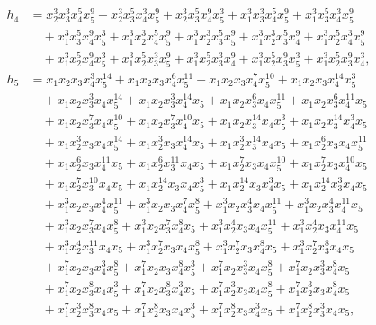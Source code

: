 \documentclass[reqno]{amsart}
\theoremstyle{plain}
\theoremstyle{definition}
\theoremstyle{plain}
\theoremstyle{definition}
\numberwithin{equation}{section}
\begin{document}
\begin{align*}
h_4 &= x_2^{3}x_3^{3}x_4^{5}x_5^{9} + x_2^{3}x_3^{5}x_4^{3}x_5^{9} + x_2^{3}x_3^{5}x_4^{9}x_5^{3} + x_1^{3}x_3^{3}x_4^{5}x_5^{9} + x_1^{3}x_3^{5}x_4^{3}x_5^{9}\\ &\quad + x_1^{3}x_3^{5}x_4^{9}x_5^{3} + x_1^{3}x_2^{3}x_4^{5}x_5^{9} + x_1^{3}x_2^{3}x_3^{5}x_5^{9} + x_1^{3}x_2^{3}x_3^{5}x_4^{9} + x_1^{3}x_2^{5}x_4^{3}x_5^{9}\\ &\quad + x_1^{3}x_2^{5}x_4^{9}x_5^{3} + x_1^{3}x_2^{5}x_3^{3}x_5^{9} + x_1^{3}x_2^{5}x_3^{3}x_4^{9} + x_1^{3}x_2^{5}x_3^{9}x_5^{3} + x_1^{3}x_2^{5}x_3^{9}x_4^{3},\\
h_5 &= x_1x_2x_3x_4^{3}x_5^{14} + x_1x_2x_3x_4^{6}x_5^{11} + x_1x_2x_3x_4^{7}x_5^{10} + x_1x_2x_3x_4^{14}x_5^{3}\\ &\quad + x_1x_2x_3^{3}x_4x_5^{14} + x_1x_2x_3^{3}x_4^{14}x_5 + x_1x_2x_3^{6}x_4x_5^{11} + x_1x_2x_3^{6}x_4^{11}x_5\\ &\quad + x_1x_2x_3^{7}x_4x_5^{10} + x_1x_2x_3^{7}x_4^{10}x_5 + x_1x_2x_3^{14}x_4x_5^{3} + x_1x_2x_3^{14}x_4^{3}x_5\\ &\quad + x_1x_2^{3}x_3x_4x_5^{14} + x_1x_2^{3}x_3x_4^{14}x_5 + x_1x_2^{3}x_3^{14}x_4x_5 + x_1x_2^{6}x_3x_4x_5^{11}\\ &\quad + x_1x_2^{6}x_3x_4^{11}x_5 + x_1x_2^{6}x_3^{11}x_4x_5 + x_1x_2^{7}x_3x_4x_5^{10} + x_1x_2^{7}x_3x_4^{10}x_5\\ &\quad + x_1x_2^{7}x_3^{10}x_4x_5 + x_1x_2^{14}x_3x_4x_5^{3} + x_1x_2^{14}x_3x_4^{3}x_5 + x_1x_2^{14}x_3^{3}x_4x_5\\ &\quad + x_1^{3}x_2x_3x_4^{4}x_5^{11} + x_1^{3}x_2x_3x_4^{7}x_5^{8} + x_1^{3}x_2x_3^{4}x_4x_5^{11} + x_1^{3}x_2x_3^{4}x_4^{11}x_5\\ &\quad + x_1^{3}x_2x_3^{7}x_4x_5^{8} + x_1^{3}x_2x_3^{7}x_4^{8}x_5 + x_1^{3}x_2^{4}x_3x_4x_5^{11} + x_1^{3}x_2^{4}x_3x_4^{11}x_5\\ &\quad + x_1^{3}x_2^{4}x_3^{11}x_4x_5 + x_1^{3}x_2^{7}x_3x_4x_5^{8} + x_1^{3}x_2^{7}x_3x_4^{8}x_5 + x_1^{3}x_2^{7}x_3^{8}x_4x_5\\ &\quad + x_1^{7}x_2x_3x_4^{3}x_5^{8} + x_1^{7}x_2x_3x_4^{8}x_5^{3} + x_1^{7}x_2x_3^{3}x_4x_5^{8} + x_1^{7}x_2x_3^{3}x_4^{8}x_5\\ &\quad + x_1^{7}x_2x_3^{8}x_4x_5^{3} + x_1^{7}x_2x_3^{8}x_4^{3}x_5 + x_1^{7}x_2^{3}x_3x_4x_5^{8} + x_1^{7}x_2^{3}x_3x_4^{8}x_5\\ &\quad + x_1^{7}x_2^{3}x_3^{8}x_4x_5 + x_1^{7}x_2^{8}x_3x_4x_5^{3} + x_1^{7}x_2^{8}x_3x_4^{3}x_5 + x_1^{7}x_2^{8}x_3^{3}x_4x_5,\\

\end{align*}
\end{document}

